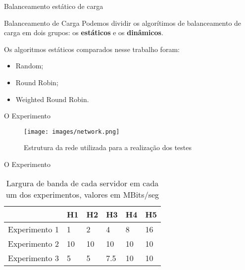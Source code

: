 \documentclass{beamer}
\begin{document}
\begin{frame}{Balanceamento estático de carga}

    \begin{block}{Balanceamento de Carga}
        Podemos dividir os algorítimos de balanceamento de carga em dois grupos: os \textbf{estáticos} e os \textbf{dinâmicos}.
    \end{block}

    Os algoritmos estáticos comparados nesse trabalho foram:
    
    \begin{itemize}  
        \item Random;
        \item Round Robin;
        \item Weighted Round Robin.
    \end{itemize}
\end{frame}
  
\begin{frame}{O Experimento}
    \begin{figure}[ht]
    \centering
    \texttt{[image: images/network.png]}
    \caption{Estrutura da rede utilizada para a realização dos testes}
    \label{fig:rede_proposta}
    \end{figure}
\end{frame}  
  
\begin{frame}{O Experimento}
    \begin{table}[]
    \centering
    \caption{Largura de banda de cada servidor em cada um dos experimentos, valores em MBits/seg}
    \label{largura_banda}
    \begin{tabular}{llllll}
     & H1 & H2 & H3  & H4 & H5 \\\hline
    Experimento 1                  & 1  & 2  & 4   & 8  & 16 \\
    Experimento 2                  & 10 & 10 & 10  & 10 & 10 \\
    Experimento 3                  & 5  & 5  & 7.5 & 10 & 10
    \end{tabular}
    \end{table}
\end{frame}    
  
\end{document}
